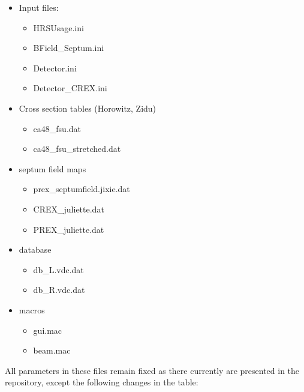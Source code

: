 \documentclass[11pt]{amsart}
\begin{document}
\begin{itemize}
\item Input files:
  \begin{itemize}
  \item HRSUsage.ini
  \item BField\_Septum.ini
  \item Detector.ini
  \item Detector\_CREX.ini
  \end{itemize}
\item Cross section tables (Horowitz, Zidu)
  \begin{itemize}
  \item ca48\_fsu.dat
  \item ca48\_fsu\_stretched.dat
  \end{itemize}
\item septum field maps
  \begin{itemize}
  \item prex\_septumfield.jixie.dat
  \item CREX\_juliette.dat
  \item PREX\_juliette.dat
  \end{itemize}
\item database
  \begin{itemize}
  \item db\_L.vdc.dat
  \item db\_R.vdc.dat
  \end{itemize}
\item macros
  \begin{itemize}
  \item gui.mac
  \item beam.mac
  \end{itemize}
\end{itemize}

All parameters in these files remain fixed as there currently are presented in the repository, except the following changes in the table:
\end{document}

